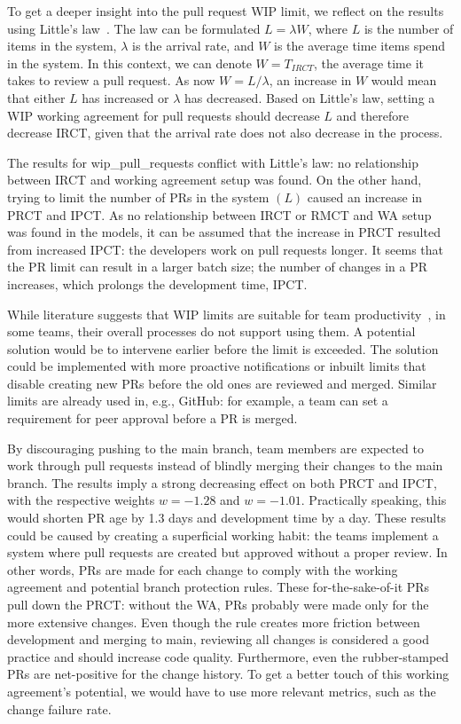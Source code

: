 To get a deeper insight into the pull request WIP limit, we reflect on the results using Little's law~\cite{chhajed_building_2008}. The law can be formulated $L=\lambda W$, where $L$ is the number of items in the system, $\lambda$ is the arrival rate, and $W$ is the average time items spend in the system. In this context, we can denote $W=T_{IRCT}$, the average time it takes to review a pull request. As now $W=L/\lambda$, an increase in $W$ would mean that either $L$ has increased or $\lambda$ has decreased. Based on Little's law, setting a WIP working agreement for pull requests should decrease $L$ and therefore decrease IRCT, given that the arrival rate does not also decrease in the process. 

The results for wip\_pull\_requests conflict with Little's law: no relationship between IRCT and working agreement setup was found. On the other hand, trying to limit the number of PRs in the system $(L)$ caused an increase in PRCT and IPCT. As no relationship between IRCT or RMCT and WA setup was found in the models, it can be assumed that the increase in PRCT resulted from increased IPCT: the developers work on pull requests longer. It seems that the PR limit can result in a larger batch size; the number of changes in a PR increases, which prolongs the development time, IPCT. 

While literature suggests that WIP limits are suitable for team productivity~\cite{reinertsen_principles_2009}, in some teams, their overall processes do not support using them. A potential solution would be to intervene earlier before the limit is exceeded. The solution could be implemented with more proactive notifications or inbuilt limits that disable creating new PRs before the old ones are reviewed and merged. Similar limits are already used in, e.g., GitHub: for example, a team can set a requirement for peer approval before a PR is merged.

By discouraging pushing to the main branch, team members are expected to work through pull requests instead of blindly merging their changes to the main branch. The results imply a strong decreasing effect on both PRCT and IPCT, with the respective weights $w=-1.28$ and $w=-1.01$. Practically speaking, this would shorten PR age by 1.3 days and development time by a day. These results could be caused by creating a superficial working habit: the teams implement a system where pull requests are created but approved without a proper review. In other words, PRs are made for each change to comply with the working agreement and potential branch protection rules. These for-the-sake-of-it PRs pull down the PRCT: without the WA, PRs probably were made only for the more extensive changes. Even though the rule creates more friction between development and merging to main, reviewing all changes is considered a good practice and should increase code quality. Furthermore, even the rubber-stamped PRs are net-positive for the change history. To get a better touch of this working agreement's potential, we would have to use more relevant metrics, such as the change failure rate. 

